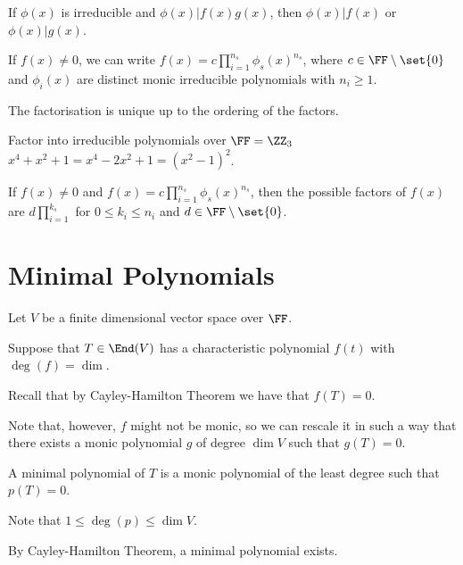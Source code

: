 \documentclass[11pt]{scrartcl}
\begin{document}
\begin{theorem}
  If $\phi(x)$ is irreducible and $\phi(x) | f(x) g(x)$, then
  $\phi(x) | f(x)$ or $\phi(x) | g(x)$.
\end{theorem}

\begin{theorem}
  If $f(x)\neq 0$, we can write $f(x) = c\prod_{i=1}^{n_s}\phi_s(x)^{n_s}$, where $c\in \FF\setminus \set{0}$ and $\phi_i(x)$ are distinct monic irreducible polynomials with $n_i\geq 1$.

  The factorisation is unique up to the ordering of the factors.
\end{theorem}

\begin{example}

Factor into irreducible polynomials over $\FF = \ZZ_3$ $x^4+x^2+1 = x^4-2x^2+1 = (x^2-1)^2$.

\end{example}

\begin{remark}
  If $f(x)\neq 0$ and $f(x) = c\prod_{i=1}^{n_s}\phi_s(x)^{n_s}$, then
  the possible factors of $f(x)$ are $d\prod_{i=1}^{k_s}$ for
  $0\leq k_i\leq n_i$ and $d\in \FF\setminus \set{0}$.
\end{remark}

\section{Minimal Polynomials}

Let $V$ be a finite dimensional vector space over $\FF$.

Suppose that $T \in \End(V)$ has a characteristic polynomial $f(t)$
with $\deg(f) = \dim$.

Recall that by Cayley-Hamilton Theorem we have that $f(T) = 0$.

Note that, however, $f$ might not be monic, so we can rescale it in such a way that there exists a monic polynomial $g$ of degree $\dim V$ such that $g(T) = 0$.

\begin{definition}
  A minimal polynomial of $T$ is a monic polynomial of the least
  degree such that $p(T) = 0$.
\end{definition}
\begin{remark}
Note that $1 \leq \deg (p) \leq \dim V$.
\end{remark}

By Cayley-Hamilton Theorem, a minimal polynomial exists.
\end{document}
